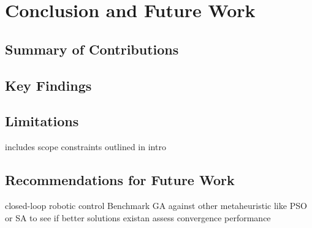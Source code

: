 \chapter{Conclusion and Future Work}
\label{Conclusion}
\section{Summary of Contributions}
\section{Key Findings}
\section{Limitations}
includes scope constraints outlined in intro
\section{Recommendations for Future Work}
closed-loop robotic control
Benchmark GA against other metaheuristic like PSO or SA to see if better solutions existan assess convergence performance 